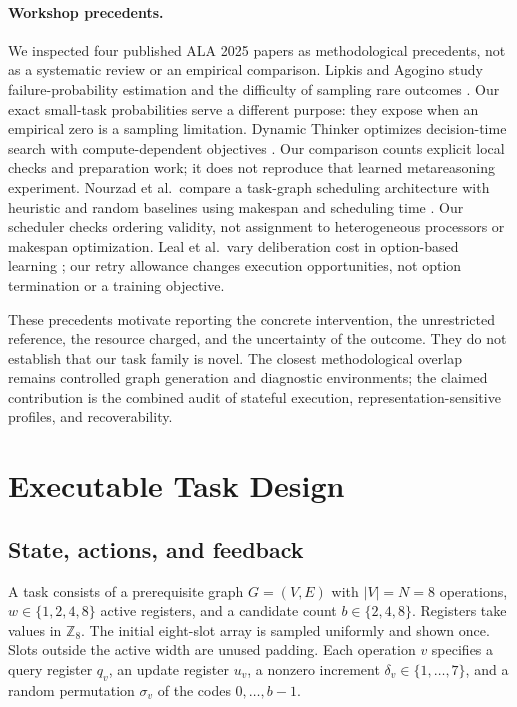 \documentclass[sigconf,nonacm]{acmart}
\begin{document}
\paragraph{Workshop precedents.}
We inspected four published ALA 2025 papers as methodological precedents,
not as a systematic review or an empirical comparison. Lipkis and Agogino
study failure-probability estimation and the difficulty of sampling rare
outcomes \cite{lipkis}. Our exact small-task probabilities serve a different
purpose: they expose when an empirical zero is a sampling limitation.
Dynamic Thinker optimizes decision-time search with compute-dependent
objectives \cite{dynamic}. Our comparison counts explicit local checks and
preparation work; it does not reproduce that learned metareasoning
experiment. Nourzad et al.\ compare a task-graph scheduling architecture
with heuristic and random baselines using makespan and scheduling time
\cite{actortwin}. Our scheduler checks ordering validity, not assignment to
heterogeneous processors or makespan optimization. Leal et al.\ vary
deliberation cost in option-based learning \cite{deliberation};
our retry allowance changes execution opportunities, not option termination
or a training objective.

These precedents motivate reporting the concrete intervention, the
unrestricted reference, the resource charged, and the uncertainty of the
outcome. They do not establish that our task family is novel. The closest
methodological overlap remains controlled graph generation and diagnostic
environments; the claimed contribution is the combined audit of stateful
execution, representation-sensitive profiles, and recoverability.

\section{Executable Task Design}
\subsection{State, actions, and feedback}
A task consists of a prerequisite graph $G=(V,E)$ with $|V|=N=8$ operations,
$w\in\{1,2,4,8\}$ active registers, and a candidate count
$b\in\{2,4,8\}$. Registers take values in $\mathbb Z_8$. The initial eight-slot
array is sampled uniformly and shown once. Slots outside the active width
are unused padding. Each operation $v$ specifies a query register $q_v$,
an update register $u_v$, a nonzero increment $\delta_v\in\{1,\ldots,7\}$,
and a random permutation $\sigma_v$ of the codes $0,\ldots,b-1$.
\end{document}
